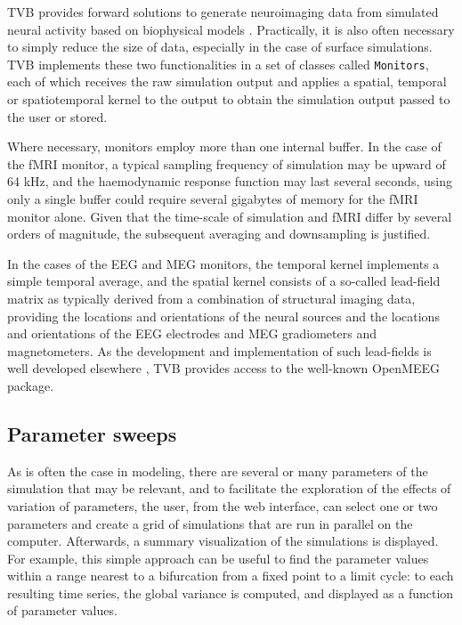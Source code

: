 \documentclass{bioinfo}
\begin{document}
TVB provides forward solutions to generate neuroimaging data from 
simulated neural activity based on biophysical models 
\citep{Buxton_2004, Jirsa_2002}. Practically, it is also often
necessary to simply reduce the size of data, especially in the case of 
surface simulations. TVB implements these two functionalities in
a set of classes called \texttt{Monitors}, each of which receives
the raw simulation output and applies a spatial, temporal or spatiotemporal
kernel to the output to obtain the simulation output passed to the
user or stored. 

Where necessary, monitors employ more than one internal buffer. In the case of 
the fMRI monitor, a typical sampling frequency of simulation may be upward of 
64 kHz, and the haemodynamic response function may last several seconds, 
using only a single buffer could require several gigabytes of memory for the 
fMRI monitor alone. Given that 
the time-scale of simulation and fMRI differ by several orders of magnitude, 
the subsequent averaging and downsampling is justified. 

In the cases of the EEG and MEG monitors, the temporal kernel implements a
simple temporal average, and the spatial kernel consists of a so-called
lead-field matrix as typically derived from a combination of structural imaging
data, providing the locations and orientations of the neural sources and the
locations and orientations of the EEG electrodes and MEG gradiometers and
magnetometers.  As the development and implementation of such lead-fields is
well developed elsewhere
\citep{Sarvas_1987,Hamalainen_1989,Jirsa_2002,Nolte2003,Gramfort_2010}, TVB
provides access to the well-known OpenMEEG package.

\subsection{Parameter sweeps}

As is often the case in modeling, there are several or many parameters of the
simulation that may be relevant, and to facilitate the exploration of the effects
of variation of parameters, the user, from the web interface, can select one or
two parameters and create a grid of simulations that are run in parallel on the
computer. Afterwards, a summary visualization of the simulations is displayed. For
example, this simple approach can be useful to find the parameter
values within a range nearest to a bifurcation from a fixed point to a limit
cycle: to each resulting time series, the global variance is computed, and 
displayed as a function of parameter values. 
\end{document}
